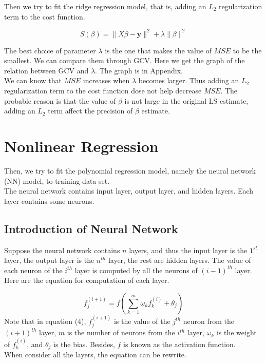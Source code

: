 \documentclass[12pt,a4paper]{article}
\begin{document}
Then we try to fit the ridge regression model, that is, adding an $L_{2}$ regularization term to the cost function.

\begin{equation}
S(\beta)= \lVert X\beta-\bm{y}\rVert^{2}+\lambda\lVert\beta\rVert^{2}
\end{equation}

The best choice of parameter $\lambda$ is the one that makes the value of $MSE$ to be the smallest. We can compare them through GCV. Here we get the graph of the relation between GCV and $\lambda$. The graph is in Appendix.\\
\indent We can know that $MSE$ increases when $\lambda$ becomes larger. Thus adding an $L_{2}$ regularization term to the cost function dose not help decrease $MSE$. The probable reason is that the value of $\beta$ is not large in the original LS estimate, adding an $L_{2}$ term affect the precision of $\beta$ estimate.

\section{Nonlinear Regression} 
\qquad Then, we try to fit the polynomial regression model, namely the neural network (NN) model, to training data set.\\
\indent The neural network contains input layer, output layer, and hidden layers. Each layer contains some neurons. 

\subsection{Introduction of Neural Network}
\qquad Suppose the neural network contains $n$ layers, and thus the input layer is the $1^{st}$ layer, the output layer is the $n^{th}$ layer, the rest are hidden layers. The value of each neuron of the $i^{th}$ layer is computed by all the neurons of $(i-1)^{th}$ layer.\\
\indent Here are the equation for computation of each layer.

\begin{equation}
f_{j}^{(i+1)}=f\left(\sum_{k=1}^{m}\omega_{k}f_{k}^{(i)}+\theta_{j}\right)
\end{equation}
Note that in equation (4), $f_{j}^{(i+1)}$ is the value of the $j^{th}$ neuron from the $(i+1)^{th}$ layer, $m$ is the number of neurons from the $i^{th}$ layer, $\omega_{k}$ is the weight of $f_{k}^{(i)}$, and $\theta_{j}$ is the bias. Besides, $f$ is known as the activation function.\\
\indent When consider all the layers, the equation can be rewrite.
\end{document}
